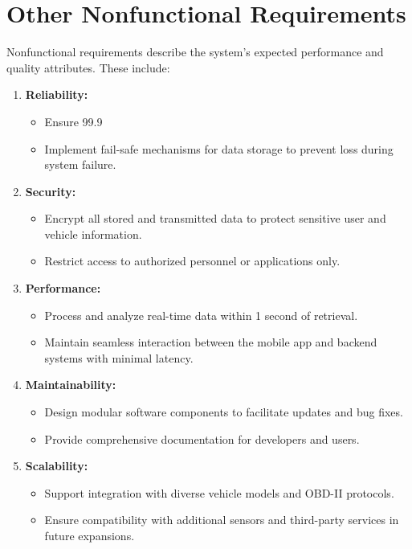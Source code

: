 \section{Other Nonfunctional Requirements}
Nonfunctional requirements describe the system's expected performance and quality attributes. These include:

\begin{enumerate}
    \item \textbf{Reliability:}
    \begin{itemize}
        \item Ensure 99.9%
        \item Implement fail-safe mechanisms for data storage to prevent loss during system failure.
    \end{itemize}
    \item \textbf{Security:}
    \begin{itemize}
        \item Encrypt all stored and transmitted data to protect sensitive user and  vehicle information. 
        \item Restrict access to authorized personnel or applications only.
    \end{itemize}
    \item \textbf{Performance:}
    \begin{itemize}
        \item Process and analyze real-time data within 1 second of retrieval.
        \item Maintain seamless interaction between the mobile app and backend systems with minimal latency.
    \end{itemize}
    \item \textbf{Maintainability:}
    \begin{itemize}
        \item Design modular software components to facilitate updates and bug fixes.
        \item Provide comprehensive documentation for developers and users.
    \end{itemize}
    \item \textbf{Scalability:}
    \begin{itemize}
        \item Support integration with diverse vehicle models and OBD-II protocols.
        \item Ensure compatibility with additional sensors and third-party services in future expansions.
    \end{itemize}
\end{enumerate}

